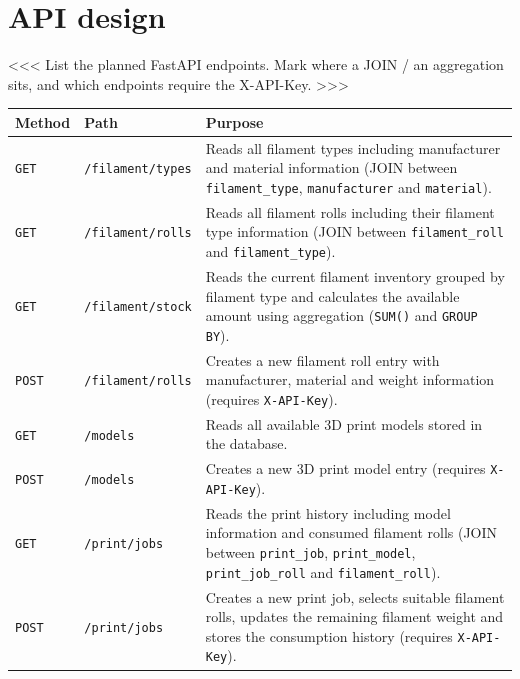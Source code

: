 \documentclass[11pt,a4paper]{article}
\begin{document}
\section{API design}

<<< List the planned FastAPI endpoints. Mark where a JOIN / an aggregation
sits, and which endpoints require the X-API-Key. >>>

\renewcommand{\arraystretch}{1.2}
\begin{tabularx}{\linewidth}{@{}p{2cm}p{4cm}X@{}}
\toprule
\textbf{Method} & \textbf{Path} & \textbf{Purpose} \\
\midrule

\texttt{GET} &
\texttt{/filament/types} &
Reads all filament types including manufacturer and material information
(JOIN between \texttt{filament\_type}, \texttt{manufacturer} and
\texttt{material}). \\

\texttt{GET} &
\texttt{/filament/rolls} &
Reads all filament rolls including their filament type information
(JOIN between \texttt{filament\_roll} and \texttt{filament\_type}). \\

\texttt{GET} &
\texttt{/filament/stock} &
Reads the current filament inventory grouped by filament type and calculates
the available amount using aggregation (\texttt{SUM()} and \texttt{GROUP BY}). \\

\texttt{POST} &
\texttt{/filament/rolls} &
Creates a new filament roll entry with manufacturer, material and weight
information (requires \texttt{X-API-Key}). \\

\texttt{GET} &
\texttt{/models} &
Reads all available 3D print models stored in the database. \\

\texttt{POST} &
\texttt{/models} &
Creates a new 3D print model entry
(requires \texttt{X-API-Key}). \\

\texttt{GET} &
\texttt{/print/jobs} &
Reads the print history including model information and consumed filament
rolls (JOIN between \texttt{print\_job}, \texttt{print\_model},
\texttt{print\_job\_roll} and \texttt{filament\_roll}). \\

\texttt{POST} &
\texttt{/print/jobs} &
Creates a new print job, selects suitable filament rolls, updates the remaining
filament weight and stores the consumption history
(requires \texttt{X-API-Key}). \\


\bottomrule
\end{tabularx}
\end{document}
